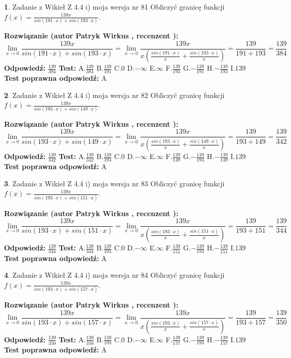 \documentclass[12pt, a4paper]{article}
\theoremstyle{definition} %
\newtheorem{zad}{}
\newcommand{\zadStart}[1]{\begin{zad}#1\newline}
\newcommand{\zadStop}{\end{zad}}
\newcommand{\rozwStart}[2]{\noindent \textbf{Rozwiązanie (autor #1 , recenzent #2): }\newline}
\newcommand{\rozwStop}{\newline}
\newcommand{\odpStart}{\noindent \textbf{Odpowiedź:}\newline}
\newcommand{\odpStop}{\newline}
\newcommand{\testStart}{\noindent \textbf{Test:}\newline}
\newcommand{\testStop}{\newline}
\newcommand{\kluczStart}{\noindent \textbf{Test poprawna odpowiedź:}\newline}
\newcommand{\kluczStop}{\newline}
\begin{document}
\zadStart{Zadanie z Wikieł Z 4.4 i) moja wersja nr 81}
Obliczyć granicę funkcji $f(x)=\frac{139x}{sin(191\cdot x) +sin(193\cdot x)}$.
\zadStop
\rozwStart{Patryk Wirkus}{}
$$\lim\limits_{x\to 0}\frac{139x}{sin(191\cdot x) +sin(193\cdot x)}=\lim\limits_{x\to 0}\frac{139x}{x(\frac{sin(191\cdot x)}{x}+\frac{sin(193\cdot x)}{x})}=\frac{139}{191+193} = \frac{139}{384}$$
\rozwStop
\odpStart
$\frac{139}{384}$
\odpStop
\testStart
A.$\frac{139}{384}$
B.$\frac{139}{191}$
C.$0$
D.$-\infty$
E.$\infty$
F.$\frac{139}{193}$
G.$-\frac{139}{191}$
H.$-\frac{139}{193}$
I.$139$
\testStop
\kluczStart
A
\kluczStop



\zadStart{Zadanie z Wikieł Z 4.4 i) moja wersja nr 82}
Obliczyć granicę funkcji $f(x)=\frac{139x}{sin(193\cdot x) +sin(149\cdot x)}$.
\zadStop
\rozwStart{Patryk Wirkus}{}
$$\lim\limits_{x\to 0}\frac{139x}{sin(193\cdot x) +sin(149\cdot x)}=\lim\limits_{x\to 0}\frac{139x}{x(\frac{sin(193\cdot x)}{x}+\frac{sin(149\cdot x)}{x})}=\frac{139}{193+149} = \frac{139}{342}$$
\rozwStop
\odpStart
$\frac{139}{342}$
\odpStop
\testStart
A.$\frac{139}{342}$
B.$\frac{139}{193}$
C.$0$
D.$-\infty$
E.$\infty$
F.$\frac{139}{149}$
G.$-\frac{139}{193}$
H.$-\frac{139}{149}$
I.$139$
\testStop
\kluczStart
A
\kluczStop



\zadStart{Zadanie z Wikieł Z 4.4 i) moja wersja nr 83}
Obliczyć granicę funkcji $f(x)=\frac{139x}{sin(193\cdot x) +sin(151\cdot x)}$.
\zadStop
\rozwStart{Patryk Wirkus}{}
$$\lim\limits_{x\to 0}\frac{139x}{sin(193\cdot x) +sin(151\cdot x)}=\lim\limits_{x\to 0}\frac{139x}{x(\frac{sin(193\cdot x)}{x}+\frac{sin(151\cdot x)}{x})}=\frac{139}{193+151} = \frac{139}{344}$$
\rozwStop
\odpStart
$\frac{139}{344}$
\odpStop
\testStart
A.$\frac{139}{344}$
B.$\frac{139}{193}$
C.$0$
D.$-\infty$
E.$\infty$
F.$\frac{139}{151}$
G.$-\frac{139}{193}$
H.$-\frac{139}{151}$
I.$139$
\testStop
\kluczStart
A
\kluczStop



\zadStart{Zadanie z Wikieł Z 4.4 i) moja wersja nr 84}
Obliczyć granicę funkcji $f(x)=\frac{139x}{sin(193\cdot x) +sin(157\cdot x)}$.
\zadStop
\rozwStart{Patryk Wirkus}{}
$$\lim\limits_{x\to 0}\frac{139x}{sin(193\cdot x) +sin(157\cdot x)}=\lim\limits_{x\to 0}\frac{139x}{x(\frac{sin(193\cdot x)}{x}+\frac{sin(157\cdot x)}{x})}=\frac{139}{193+157} = \frac{139}{350}$$
\rozwStop
\odpStart
$\frac{139}{350}$
\odpStop
\testStart
A.$\frac{139}{350}$
B.$\frac{139}{193}$
C.$0$
D.$-\infty$
E.$\infty$
F.$\frac{139}{157}$
G.$-\frac{139}{193}$
H.$-\frac{139}{157}$
I.$139$
\testStop
\kluczStart
A
\kluczStop
\end{document}
